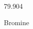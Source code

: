 \documentclass[12pt]{article}
\begin{document}
\hfill{}
\vfill
\begin{center}
  {\fontsize{50}{60}
  }

  79.904

Bromine
\end{center}
\vfill
\end{document}
